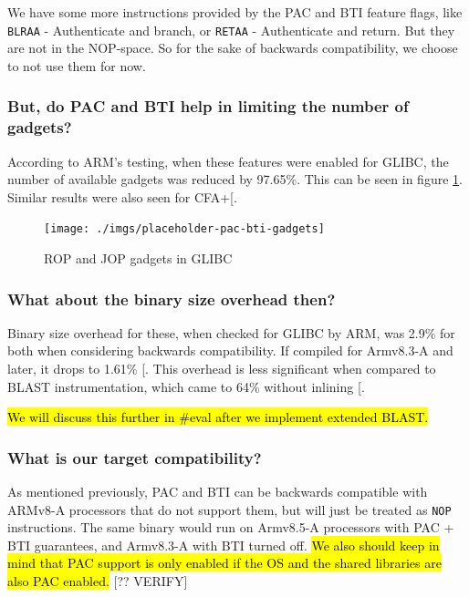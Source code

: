 \documentclass[a4paper, nobind]{templates/ociamthesis}
\begin{document}
We have some more instructions provided by the PAC and BTI feature flags,
like \texttt{BLRAA} - Authenticate and branch, or \texttt{RETAA} - Authenticate and return.
But they are not in the NOP-space. So for the sake of backwards compatibility,
we choose to not use them for now.

\subsubsection{But, do PAC and BTI help in limiting the number of gadgets?}\label{but-do-pac-and-bti-help-in-limiting-the-number-of-gadgets}

According to ARM's testing, when these features were enabled for GLIBC, the number
of available gadgets was reduced by 97.65\%. This can be seen in figure \ref{fig:pac-bti-gadgets}.
Similar results were also seen for CFA+{[}\citeproc{ref-cfaplus}{1}{]}.

\begin{figure}

{\centering \texttt{[image: ./imgs/placeholder-pac-bti-gadgets]} 

}

\caption{ROP and JOP gadgets in GLIBC}\label{fig:pac-bti-gadgets}
\end{figure}

\subsubsection{What about the binary size overhead then?}\label{what-about-the-binary-size-overhead-then}

Binary size overhead for these, when checked for GLIBC by ARM, was 2.9\% for both
when considering backwards compatibility. If compiled for Armv8.3-A and later,
it drops to 1.61\% {[}\citeproc{ref-arm-pacbti}{5}{]}.
This overhead is less significant when compared to BLAST instrumentation, which
came to 64\% without inlining {[}\citeproc{ref-blast}{25}{]}.

\hl{We will discuss this further in \#eval after we implement extended BLAST.}

\subsubsection{What is our target compatibility?}\label{what-is-our-target-compatibility}

As mentioned previously, PAC and BTI can be backwards compatible with ARMv8-A processors
that do not support them, but will just be treated as \texttt{NOP} instructions.
The same binary would run on Armv8.5-A processors with PAC + BTI guarantees, and
Armv8.3-A with BTI turned off.
\hl{We also should keep in mind that PAC support is only enabled if the OS and the
shared libraries are also PAC enabled.}
{[}?? VERIFY{]}
\end{document}
